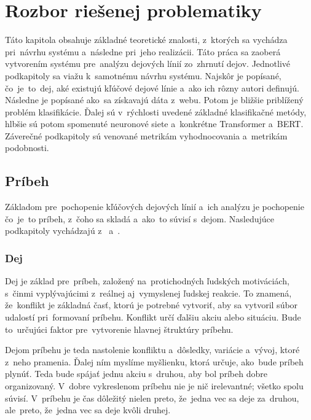 \chapter{Rozbor riešenej problematiky}
\label{teoria}

Táto kapitola obsahuje základné teoretické znalosti, z~ktorých sa vychádza pri~návrhu systému a~následne pri~jeho realizácii. Táto práca sa zaoberá vytvorením systému pre~analýzu dejových línií zo~zhrnutí dejov. Jednotlivé podkapitoly sa viažu k~samotnému návrhu systému.
Najskôr je popísané, čo~je~to~dej, aké existujú kľúčové dejové línie a~ako ich rôzny autori definujú. Následne je popísané ako~sa získavajú dáta z~webu. Potom je bližšie priblížený problém klasifikácie. Ďalej sú v~rýchlosti uvedené základné klasifikačné metódy, hlbšie sú potom spomenuté neuronové siete a~konkrétne Transformer a~BERT. Záverečné podkapitoly sú venované metrikám vyhodnocovania a~metrikám podobnosti.


\section{Príbeh}
Základom pre~pochopenie kľúčových dejových línií a~ich analýzu je pochopenie čo~je~to príbeh, z~čoho sa skladá a~ako~to súvisí s~dejom. Nasledujúce podkapitoly vychádzajú \linebreak
z~\cite{Rosaria:2004} a~\cite{Roberts:1987}.

\subsection*{Dej}

Dej je základ pre~príbeh, založený na~protichodných ľudských motiváciách, s~činmi vyplývajúcimi z~reálnej aj~vymyslenej ľudskej reakcie. To znamená, že~konflikt je základná časť, ktorú je potrebné vytvoriť, aby sa vytvoril súbor udalostí pri~formovaní príbehu. Konflikt určí ďalšiu akciu alebo situáciu. Bude to~určujúci faktor pre~vytvorenie hlavnej štruktúry príbehu.
 
Dejom príbehu je teda nastolenie konfliktu a~dôsledky, variácie a~vývoj, ktoré z~neho pramenia. Ďalej ním myslíme myšlienku, ktorá určuje, ako~bude príbeh plynúť. Teda bude spájať jednu akciu s~druhou, aby bol príbeh dobre organizovaný. V~dobre vykreslenom príbehu nie je nič irelevantné; všetko spolu súvisí. V~príbehu je čas dôležitý nielen preto, že~jedna vec sa deje za~druhou, ale~preto, že~jedna vec sa deje kvôli druhej.

